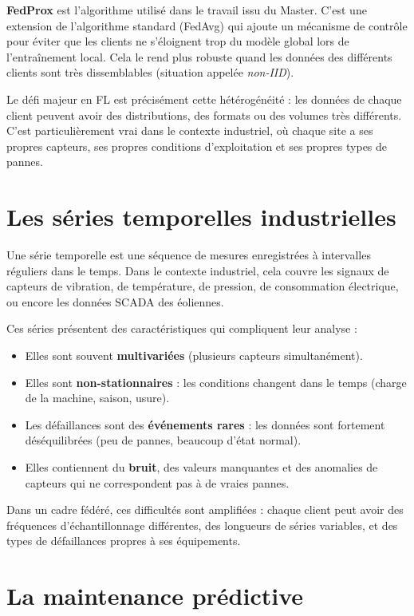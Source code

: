 \documentclass[12pt, a4paper]{report}
\begin{document}
\textbf{FedProx} est l'algorithme utilisé dans le travail issu du Master. C'est une
extension de l'algorithme standard (FedAvg) qui ajoute un mécanisme de contrôle pour
éviter que les clients ne s'éloignent trop du modèle global lors de l'entraînement local.
Cela le rend plus robuste quand les données des différents clients sont très dissemblables
(situation appelée \textit{non-IID}).

Le défi majeur en FL est précisément cette hétérogénéité : les données de chaque client
peuvent avoir des distributions, des formats ou des volumes très différents. C'est
particulièrement vrai dans le contexte industriel, où chaque site a ses propres capteurs,
ses propres conditions d'exploitation et ses propres types de pannes.

\section{Les séries temporelles industrielles}

Une série temporelle est une séquence de mesures enregistrées à intervalles réguliers
dans le temps. Dans le contexte industriel, cela couvre les signaux de capteurs de
vibration, de température, de pression, de consommation électrique, ou encore les
données SCADA des éoliennes.

Ces séries présentent des caractéristiques qui compliquent leur analyse :

\begin{itemize}
  \item Elles sont souvent \textbf{multivariées} (plusieurs capteurs simultanément).
  \item Elles sont \textbf{non-stationnaires} : les conditions changent dans le temps
  (charge de la machine, saison, usure).
  \item Les défaillances sont des \textbf{événements rares} : les données sont
  fortement déséquilibrées (peu de pannes, beaucoup d'état normal).
  \item Elles contiennent du \textbf{bruit}, des valeurs manquantes et des anomalies
  de capteurs qui ne correspondent pas à de vraies pannes.
\end{itemize}

Dans un cadre fédéré, ces difficultés sont amplifiées : chaque client peut avoir
des fréquences d'échantillonnage différentes, des longueurs de séries variables,
et des types de défaillances propres à ses équipements.

\section{La maintenance prédictive}
\end{document}
